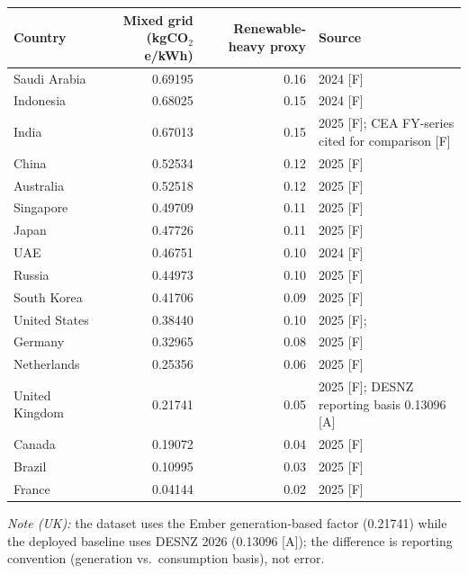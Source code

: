 \documentclass[11pt,a4paper]{article}
\begin{document}
\begin{longtable}{@{}lrrl@{}}
\toprule
Country & Mixed grid (kgCO$_2$e/kWh) & Renewable-heavy proxy & Source \\
\midrule
Saudi Arabia   & 0.69195 & 0.16 & \cite{ember_grid} 2024 [F] \\
Indonesia      & 0.68025 & 0.15 & \cite{ember_grid} 2024 [F] \\
India          & 0.67013 & 0.15 & \cite{ember_grid} 2025 [F]; CEA FY-series cited for comparison \cite{cea_baseline, wiki_india_electricity} [F] \\
China          & 0.52534 & 0.12 & \cite{ember_grid} 2025 [F] \\
Australia      & 0.52518 & 0.12 & \cite{ember_grid} 2025 [F] \\
Singapore      & 0.49709 & 0.11 & \cite{ember_grid} 2025 [F] \\
Japan          & 0.47726 & 0.11 & \cite{ember_grid} 2025 [F] \\
UAE            & 0.46751 & 0.10 & \cite{ember_grid} 2024 [F] \\
Russia         & 0.44973 & 0.10 & \cite{ember_grid} 2025 [F] \\
South Korea    & 0.41706 & 0.09 & \cite{ember_grid} 2025 [F] \\
United States  & 0.38440 & 0.10 & \cite{ember_grid} 2025 [F]; \cite{epa_equivalencies} \\
Germany        & 0.32965 & 0.08 & \cite{ember_grid} 2025 [F] \\
Netherlands    & 0.25356 & 0.06 & \cite{ember_grid} 2025 [F] \\
United Kingdom & 0.21741 & 0.05 & \cite{ember_grid} 2025 [F]; DESNZ reporting basis 0.13096 \cite{desnz2026} [A] \\
Canada         & 0.19072 & 0.04 & \cite{ember_grid} 2025 [F] \\
Brazil         & 0.10995 & 0.03 & \cite{ember_grid} 2025 [F] \\
France         & 0.04144 & 0.02 & \cite{ember_grid} 2025 [F] \\
\bottomrule
\end{longtable}

\noindent\textit{Note (UK):} the dataset uses the Ember generation-based
factor (0.21741) while the deployed baseline uses DESNZ 2026
(0.13096 \cite{desnz2026} [A]); the difference is reporting convention
(generation vs.\ consumption basis), not error.

\end{document}
